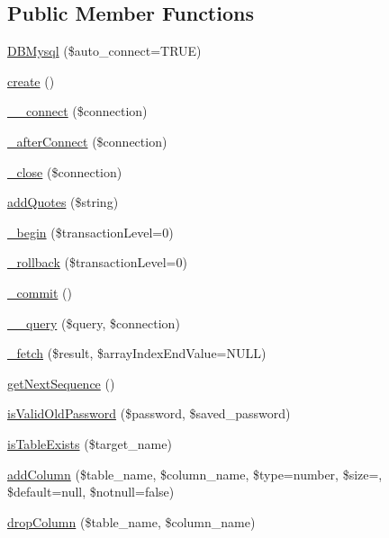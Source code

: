 \subsection*{Public Member Functions}
\begin{DoxyCompactItemize}
\item 
\hyperlink{classDBMysql_a8b17679c4439e5588d4322fe9b0e7439}{D\+B\+Mysql} (\$auto\+\_\+connect=T\+R\+UE)
\item 
\hyperlink{classDBMysql_a58ab5c56561966d486ba54129aed954d}{create} ()
\item 
\hyperlink{classDBMysql_ad11061c47d57c2f346947e0789ecb46b}{\+\_\+\+\_\+connect} (\$connection)
\item 
\hyperlink{classDBMysql_a660e94bc5cde26859bb95cc428ca92da}{\+\_\+after\+Connect} (\$connection)
\item 
\hyperlink{classDBMysql_a59581237e4dcb5f91f63de2459248e13}{\+\_\+close} (\$connection)
\item 
\hyperlink{classDBMysql_a9674193c36272fa9ea16c20d91cfbfe5}{add\+Quotes} (\$string)
\item 
\hyperlink{classDBMysql_a60dec65d2138fed25d0331e498972df8}{\+\_\+begin} (\$transaction\+Level=0)
\item 
\hyperlink{classDBMysql_af146dafdfc0dd7ce0f04427ac371a1ea}{\+\_\+rollback} (\$transaction\+Level=0)
\item 
\hyperlink{classDBMysql_a3f720677af37c36b2bc2934dd358a477}{\+\_\+commit} ()
\item 
\hyperlink{classDBMysql_aa33da673a8c415b641b4e0b5209d3453}{\+\_\+\+\_\+query} (\$query, \$connection)
\item 
\hyperlink{classDBMysql_a4c7d83d8dcbb8e65c8fdfe75fa7d9fa5}{\+\_\+fetch} (\$result, \$array\+Index\+End\+Value=N\+U\+LL)
\item 
\hyperlink{classDBMysql_a926ea6ca10e71ae128be90604b78411f}{get\+Next\+Sequence} ()
\item 
\hyperlink{classDBMysql_a19020f1ece293bcc332400234ee95dea}{is\+Valid\+Old\+Password} (\$password, \$saved\+\_\+password)
\item 
\hyperlink{classDBMysql_a095f2a64a070958c18cb3ebfab3043e5}{is\+Table\+Exists} (\$target\+\_\+name)
\item 
\hyperlink{classDBMysql_a17c3da0130dce415cde81f3298934677}{add\+Column} (\$table\+\_\+name, \$column\+\_\+name, \$type=\textquotesingle{}number\textquotesingle{}, \$size=\textquotesingle{}\textquotesingle{}, \$default=null, \$notnull=false)
\item 
\hyperlink{classDBMysql_aa4cd80d663225f3cd7a539d7d7101b38}{drop\+Column} (\$table\+\_\+name, \$column\+\_\+name)

\end{DoxyCompactItemize}
